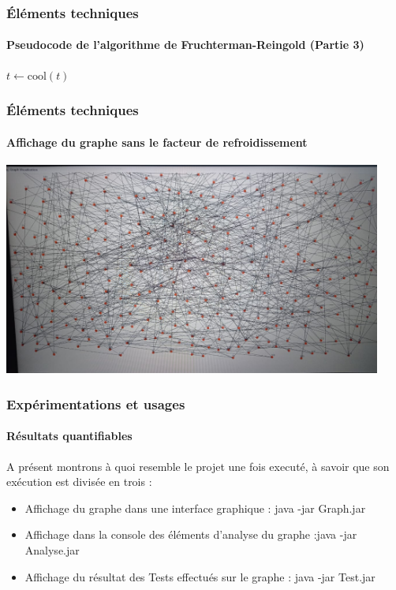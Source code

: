 \documentclass{beamer}
\begin{document}
\begin{frame}[fragile]
\frametitle{Éléments techniques}
\framesubtitle{Pseudocode de l'algorithme de Fruchterman-Reingold (Partie 3)}

\begin{algorithm}[H]
\DontPrintSemicolon
\small
\SetAlgoLined
{}



$t \gets \text{cool}(t)$\;

\end{algorithm}

\end{frame}

\begin{frame}
\frametitle{Éléments techniques}
\framesubtitle{Affichage du graphe sans le facteur de refroidissement}

\includegraphics[width=\textwidth ,height=7cm]{images/ancienGraphe.jpeg}
\end{frame}



\begin{frame}
\frametitle{Expérimentations et usages}
\framesubtitle {Résultats quantifiables}

A présent montrons à quoi resemble le projet une fois executé, à savoir que son exécution est divisée en trois :
\begin{itemize}
    \item Affichage du graphe dans une interface graphique : java -jar Graph.jar
    \item Affichage dans la console des éléments d'analyse du graphe :java -jar Analyse.jar
    \item Affichage du résultat des Tests effectués sur le graphe : java -jar Test.jar
\end{itemize}
\end{frame}
\end{document}
